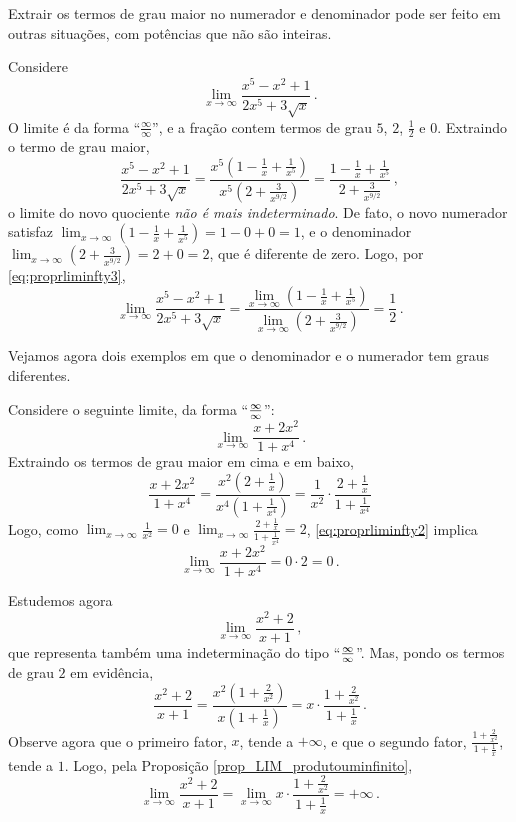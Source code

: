 Extrair os termos de grau maior no numerador e
denominador pode ser feito em outras situações, com potências que não são
inteiras.
\begin{ex}
Considere
\[
\lim_{x\to\infty}\frac{x^5-x^2+1}{2x^5+3\sqrt{x}}\,.
\]
O limite é da forma ``$\frac{\infty}{\infty}$'', e a fração contem termos de
grau $5$, $2$, $\tfrac12$ e $0$.
Extraindo o termo de grau maior,
\[
\frac{x^5-x^2+1}{2x^5+3\sqrt{x}}
=\frac{x^5(1-\frac{1}{x}+\frac{1}{x^5})}{x^5(2+\frac{3}{x^{9/2}})}
=\frac{1-\frac{1}{x}+\frac{1}{x^5}}{2+\frac{3}{x^{9/2}}}\,,
\]
o limite do novo quociente \emph{não é mais indeterminado}. De fato, 
o novo numerador satisfaz
$\lim_{x\to\infty}(1-\frac{1}{x}+\frac{1}{x^5})=1-0+0=1$, e o
denominador 
$\lim_{x\to\infty}(2+\frac{3}{x^{9/2}})=2+0=2$, que é diferente de zero.
Logo, por \eqref{eq:proprliminfty3},
\[
\lim_{x\to\infty}\frac{x^5-x^2+1}{2x^5+3\sqrt{x}}
=\frac{\lim_{x\to\infty}(1-\frac{1}{x}+\frac{1}{x^5})}{\lim_{x\to\infty}(2+\frac{3}{x^{9/2}})}
=\frac{1}{2}\,.
\]
\end{ex}

Vejamos agora dois exemplos em que o denominador e o numerador tem graus
diferentes.

\begin{ex}
Considere o seguinte limite, da forma ``$\frac{\infty}{\infty}$'':
\[ \lim_{x\to\infty}\frac{x+2x^2}{1+x^4}\,.
\]
Extraindo os termos de grau maior em cima e em baixo,
\[ 
\frac{x+2x^2}{1+x^4}=
\frac{x^2(2+\frac{1}{x})}{x^4(1+\frac{1}{x^4})}=
\frac{1}{x^2}\cdot \frac{2+\frac1{x}}{1+\frac{1}{x^4}}
\]
Logo, como $\lim_{x\to\infty}\frac{1}{x^2}=0$ e
$\lim_{x\to\infty}\frac{2+\frac1x}{1+\frac{1}{x^4}}=2$, 
\eqref{eq:proprliminfty2} implica
\[ 
 \lim_{x\to\infty}\frac{x+2x^2}{1+x^4}=0\cdot 2=0\,.
\]
\end{ex}

\begin{ex}
Estudemos agora 
\[\lim_{x\to \infty}\frac{x^2+2}{x+1}\,,\]
que representa também uma indeterminação do tipo ``$\frac{\infty}{\infty}$''.
Mas, pondo os termos de grau $2$ em evidência,
$$\frac{x^2+2}{x+1}=\frac{x^2(1+\frac{2}{x^2})}{x(1+\frac{1}{x})}=
x\cdot \frac{1+\frac{2}{x^2}}{1+\frac{1}{x}}\,.$$
Observe agora que o primeiro fator, $x$, tende a $+\infty$, e que o 
segundo fator,
$\frac{1+\frac{2}{x^2}}{1+\frac{1}{x}}$, tende a $1$. Logo, 
pela Proposição \ref{prop_LIM_produtouminfinito},
$$\lim_{x\to\infty}\frac{x^2+2}{x+1}=
\lim_{x\to\infty}x\cdot \frac{1+\frac{2}{x^2}}{1+\frac{1}{x}}=
+\infty\,.$$
\end{ex}


